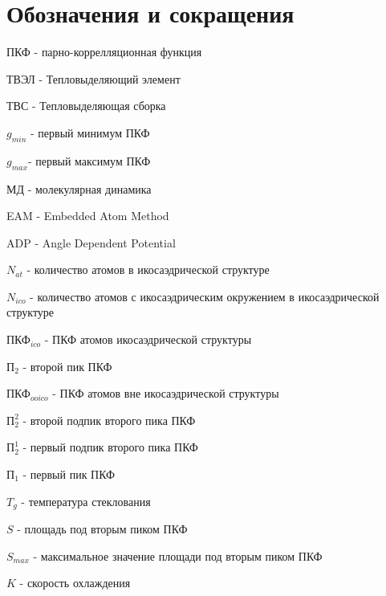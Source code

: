 \chapter*{Обозначения и сокращения}
ПКФ - парно-коррелляционная функция

ТВЭЛ - Тепловыделяющий элемент

ТВС - Тепловыделяющая сборка

$g_{min}$ - первый минимум ПКФ

$g_{max}$- первый максимум ПКФ

МД - молекулярная динамика

EAM - Embedded Atom Method

ADP - Angle Dependent Potential

$N_{at}$ - количество атомов в икосаэдрической структуре

$N_{ico}$ - количество атомов с икосаэдрическим окружением в икосаэдрической структуре

$\text{ПКФ}_{ico}$ - ПКФ атомов икосаэдрической структуры

$\text{П}_2$ - второй пик ПКФ

$\text{ПКФ}_{ooico}$ - ПКФ атомов вне икосаэдрической структуры

$\text{П}_2^2$ - второй подпик  второго пика ПКФ

$\text{П}_2^1$ - первый подпик  второго пика ПКФ

$\text{П}_1$ - первый пик ПКФ

$T_g$ - температура стеклования

$S$ - площадь под вторым пиком ПКФ

$S_{max}$ - максимальное значение площади под вторым пиком ПКФ

$K$ - скорость охлаждения



